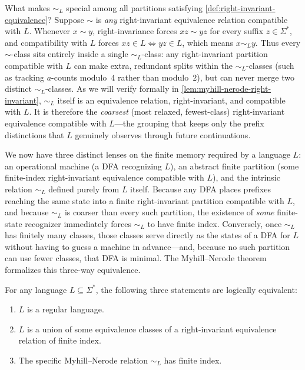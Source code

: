 What makes $\sim_L$ special among all partitions satisfying \cref{def:right-invariant-equivalence}? Suppose $\sim$ is \emph{any} right-invariant equivalence relation compatible with $L$. Whenever $x \sim y$, right-invariance forces $xz \sim yz$ for every suffix $z \in \Sigma^*$, and compatibility with $L$ forces $xz \in L \iff yz \in L$, which means $x \sim_L y$. Thus every $\sim$-class sits entirely inside a single $\sim_L$-class: any right-invariant partition compatible with $L$ can make extra, redundant splits within the $\sim_L$-classes (such as tracking $a$-counts modulo~$4$ rather than modulo~$2$), but can never merge two distinct $\sim_L$-classes. As we will verify formally in \cref{lem:myhill-nerode-right-invariant}, $\sim_L$ itself is an equivalence relation, right-invariant, and compatible with $L$. It is therefore the \emph{coarsest} (most relaxed, fewest-class) right-invariant equivalence compatible with $L$---the grouping that keeps only the prefix distinctions that $L$ genuinely observes through future continuations.

We now have three distinct lenses on the finite memory required by a language $L$: an operational machine (a DFA recognizing $L$), an abstract finite partition (some finite-index right-invariant equivalence compatible with $L$), and the intrinsic relation $\sim_L$ defined purely from $L$ itself. Because any DFA places prefixes reaching the same state into a finite right-invariant partition compatible with $L$, and because $\sim_L$ is coarser than every such partition, the existence of \emph{some} finite-state recognizer immediately forces $\sim_L$ to have finite index. Conversely, once $\sim_L$ has finitely many classes, those classes serve directly as the states of a DFA for $L$ without having to guess a machine in advance---and, because no such partition can use fewer classes, that DFA is minimal. The Myhill--Nerode theorem formalizes this three-way equivalence.

\begin{theorem}
\label{thm:myhill-nerode}
For any language $L\subseteq\Sigma^*$, the following three statements are logically equivalent:
\begin{enumerate}[nosep]
  \item $L$ is a regular language.
  \item $L$ is a union of some equivalence classes of a right-invariant equivalence relation of finite index.
  \item The specific Myhill--Nerode relation $\sim_L$ has finite index.
\end{enumerate}
\end{theorem}

